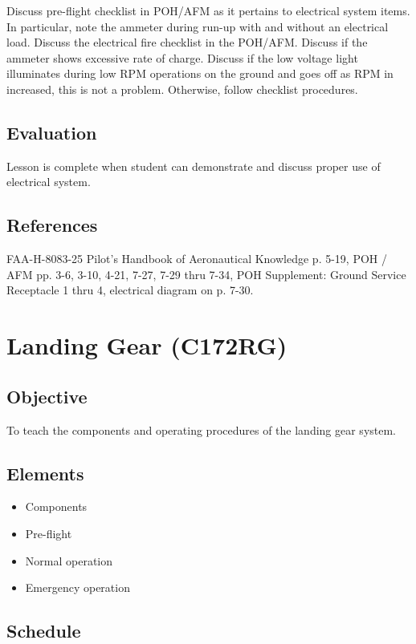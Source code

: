 \documentclass[twoside,openright]{report}
\begin{document}
Discuss pre-flight checklist in POH/AFM as it pertains to electrical system
items. In particular, note the ammeter during run-up with and without an
electrical load. Discuss the electrical fire checklist in the POH/AFM. Discuss
if the ammeter shows excessive rate of charge. Discuss if the low voltage light
illuminates during low RPM operations on the ground and goes off as RPM in
increased, this is not a problem. Otherwise, follow checklist procedures.

\section{Evaluation}

Lesson is complete when student can demonstrate and discuss proper use of
electrical system.

\section{References}

FAA-H-8083-25 Pilot's Handbook of Aeronautical Knowledge p. 5-19, POH / AFM pp.
3-6, 3-10, 4-21, 7-27, 7-29 thru 7-34, POH Supplement: Ground Service
Receptacle 1 thru 4, electrical diagram on p. 7-30.

\chapter{Landing Gear (C172RG)}

\section{Objective}

To teach the components and operating procedures of the landing gear system.

\section{Elements}

\begin{itemize}
  \item Components
  \item Pre-flight
  \item Normal operation
  \item Emergency operation
\end{itemize}

\section{Schedule}
\end{document}
